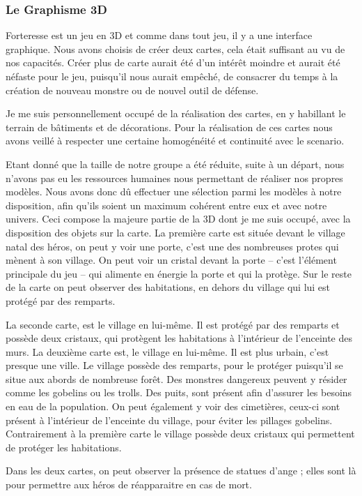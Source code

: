 \documentclass[a4paper, 12pt]{article}
\begin{document}
		\subsubsection{Le Graphisme 3D}
		Forteresse est un jeu en 3D et comme dans tout jeu, il y a une interface graphique. Nous avons choisis de créer deux cartes, cela était suffisant au vu de nos capacités. Créer plus de carte aurait été d’un intérêt moindre et aurait été néfaste pour le jeu, puisqu’il nous aurait empêché, de consacrer du temps à la création de nouveau monstre ou de nouvel outil de défense. 
\par Je me suis personnellement occupé de la réalisation des cartes, en y habillant le terrain de bâtiments et de décorations. Pour la réalisation de ces cartes nous avons veillé à respecter une certaine homogénéité  et continuité avec le scenario. 
\par Etant donné que la taille de notre groupe a été réduite, suite à un départ, nous n’avons pas eu les ressources humaines nous permettant de réaliser nos propres modèles. Nous avons donc dû effectuer une sélection parmi les modèles à notre disposition, afin qu’ils soient un maximum cohérent entre eux et avec notre univers. Ceci compose la majeure partie de la 3D dont je me suis occupé, avec la disposition des objets sur la carte.
La première carte est située devant le village natal des héros, on peut y voir une porte, c’est une des nombreuses protes qui mènent à son village. On peut voir un cristal devant la porte – c’est l’élément principale du jeu – qui alimente en énergie la porte et qui la protège. Sur le reste de la carte on peut observer des habitations, en dehors du village qui lui est protégé par des remparts.
\par La seconde carte, est le village en lui-même. Il est protégé par des remparts et possède deux cristaux, qui protègent les habitations à l’intérieur de l’enceinte des murs. 
La deuxième carte est, le village en lui-même. Il est plus urbain, c’est presque une ville. Le village possède des remparts, pour le protéger puisqu’il se situe aux abords de nombreuse forêt. Des monstres dangereux peuvent y résider comme les gobelins ou les trolls. Des puits, sont présent afin d’assurer les besoins en eau de la population. On peut également y voir des cimetières, ceux-ci sont présent à l’intérieur de l’enceinte du village, pour éviter les pillages gobelins. Contrairement à la première carte le village possède deux cristaux qui permettent de protéger les habitations.
\par Dans les deux cartes, on peut observer la présence de statues d’ange ; elles sont là pour  permettre aux héros de réapparaitre en cas de mort.
\end{document}
